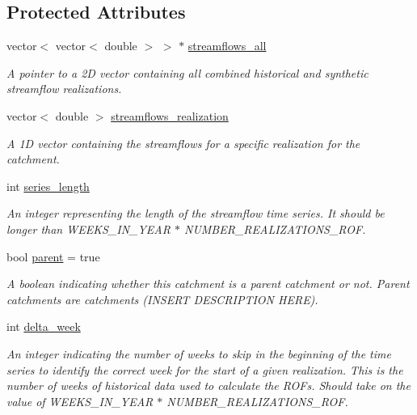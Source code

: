 \subsection*{Protected Attributes}
\begin{DoxyCompactItemize}
\item 
vector$<$ vector$<$ double $>$ $>$ $\ast$ \mbox{\hyperlink{classCatchment_a579ccda86831f286c19c76354e7125c3}{streamflows\+\_\+all}}
\begin{DoxyCompactList}\small\item\em A pointer to a 2D vector containing all combined historical and synthetic streamflow realizations. \end{DoxyCompactList}\item 
vector$<$ double $>$ \mbox{\hyperlink{classCatchment_aaf04c295ecd6b666fa1439d3d5bc072a}{streamflows\+\_\+realization}}
\begin{DoxyCompactList}\small\item\em A 1D vector containing the streamflows for a specific realization for the catchment. \end{DoxyCompactList}\item 
int \mbox{\hyperlink{classCatchment_a2d4994220f63b876348b4ce4892bc6d3}{series\+\_\+length}}
\begin{DoxyCompactList}\small\item\em An integer representing the length of the streamflow time series. It should be longer than W\+E\+E\+K\+S\+\_\+\+I\+N\+\_\+\+Y\+E\+AR $\ast$ N\+U\+M\+B\+E\+R\+\_\+\+R\+E\+A\+L\+I\+Z\+A\+T\+I\+O\+N\+S\+\_\+\+R\+OF. \end{DoxyCompactList}\item 
bool \mbox{\hyperlink{classCatchment_a472ff6892f90d94b8c4dba53c462dedf}{parent}} = true
\begin{DoxyCompactList}\small\item\em A boolean indicating whether this catchment is a parent catchment or not. Parent catchments are catchments (I\+N\+S\+E\+RT D\+E\+S\+C\+R\+I\+P\+T\+I\+ON H\+E\+RE). \end{DoxyCompactList}\item 
int \mbox{\hyperlink{classCatchment_a20548a9d03f0d39f297cb15b3c0433ad}{delta\+\_\+week}}
\begin{DoxyCompactList}\small\item\em An integer indicating the number of weeks to skip in the beginning of the time series to identify the correct week for the start of a given realization. This is the number of weeks of historical data used to calculate the R\+O\+Fs. Should take on the value of W\+E\+E\+K\+S\+\_\+\+I\+N\+\_\+\+Y\+E\+AR $\ast$ N\+U\+M\+B\+E\+R\+\_\+\+R\+E\+A\+L\+I\+Z\+A\+T\+I\+O\+N\+S\+\_\+\+R\+OF. \end{DoxyCompactList}\end{DoxyCompactItemize}


